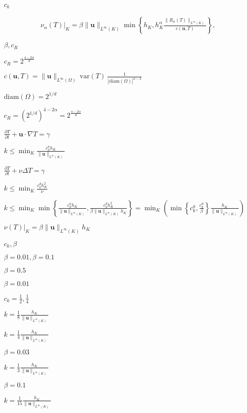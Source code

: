 \documentclass{article}
\begin{document}
$c_k$
\pagebreak

\begin{eqnarray*} \nu_\alpha(T)|_K = \beta \|\mathbf{u}\|_{L^\infty(K)} \min\left\{ h_K, h_K^\alpha \frac{\|R_\alpha(T)\|_{L^\infty(K)}}{c(\mathbf{u},T)} \right\}, \end{eqnarray*}
\pagebreak

$\beta,c_R$
\pagebreak

$c_R=2^{\frac{4-2\alpha}{d}}$
\pagebreak

$c(\mathbf{u},T) = \|\mathbf{u}\|_{L^\infty(\Omega)} \ \mathrm{var}(T) \ \frac{1}{|\mathrm{diam}(\Omega)|^{\alpha-2}}$
\pagebreak

$\mathrm{diam}(\Omega)=2^{1/d}$
\pagebreak

$c_R=\left(2^{1/d}\right)^{4-2\alpha}=2^{\frac{4-2\alpha}{d}}$
\pagebreak

$\frac{\partial T}{\partial t} + \mathbf{u}\cdot\nabla T = \gamma$
\pagebreak

$k\le \min_K \frac{c_k^a h_K}{\|\mathbf{u}\|_{L^\infty(K)}}$
\pagebreak

$\frac{\partial T}{\partial t} + \nu \Delta T = \gamma$
\pagebreak

$k\le \min_K \frac{c_k^d h_K^2}{\nu}$
\pagebreak

$ k\le \min_K \min \left\{ \frac{c_k^a h_K}{\|\mathbf{u}\|_{L^\infty(K)}}, \frac{c_k^d h_K^2}{\beta \|\mathbf{u}\|_{L^\infty(K)} h_K}\right\} = \min_K \left( \min \left\{ c_k^a, \frac{c_k^d}{\beta}\right\} \frac{h_K}{\|\mathbf{u}\|_{L^\infty(K)}} \right) $
\pagebreak

$ \nu(T)|_K = \beta \|\mathbf{u}\|_{L^\infty(K)} h_K $
\pagebreak

$c_k,\beta$
\pagebreak

$\beta=0.01, \beta=0.1$
\pagebreak

$\beta=0.5$
\pagebreak

$\beta=0.01$
\pagebreak

$c_k=\frac 12,\frac 14$
\pagebreak

$k=\frac 18\frac{h_K}{\|\mathbf{u}\|_{L^\infty(K)}}$
\pagebreak

$k=\frac 14\frac{h_K}{\|\mathbf{u}\|_{L^\infty(K)}}$
\pagebreak

$\beta=0.03$
\pagebreak

$k=\frac 13\frac{h_K}{\|\mathbf{u}\|_{L^\infty(K)}}$
\pagebreak

$\beta=0.1$
\pagebreak

$k=\frac 1{15}\frac{h_K}{\|\mathbf{u}\|_{L^\infty(K)}}$
\pagebreak
\end{document}
